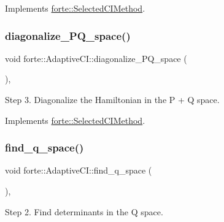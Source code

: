 Implements \mbox{\hyperlink{classforte_1_1_selected_c_i_method_a7b2b41da889659f03361f625c6df44d2}{forte\+::\+Selected\+C\+I\+Method}}.

\mbox{\label{classforte_1_1_adaptive_c_i_a307427ce58102e4a818b2e97583e2ac1}} 
\subsubsection{\texorpdfstring{diagonalize\+\_\+\+P\+Q\+\_\+space()}{diagonalize\_PQ\_space()}}
{\footnotesize\ttfamily void forte\+::\+Adaptive\+C\+I\+::diagonalize\+\_\+\+P\+Q\+\_\+space (\begin{DoxyParamCaption}{ }\end{DoxyParamCaption})\hspace{0.3cm}{\ttfamily [override]}, {\ttfamily [virtual]}}



Step 3. Diagonalize the Hamiltonian in the P + Q space. 



Implements \mbox{\hyperlink{classforte_1_1_selected_c_i_method_a9f01588d22401cd2631a09940ea7db50}{forte\+::\+Selected\+C\+I\+Method}}.

\mbox{\label{classforte_1_1_adaptive_c_i_a84c2bbf2fd0dbcfe3732c0fb6a383bd8}} 
\subsubsection{\texorpdfstring{find\+\_\+q\+\_\+space()}{find\_q\_space()}}
{\footnotesize\ttfamily void forte\+::\+Adaptive\+C\+I\+::find\+\_\+q\+\_\+space (\begin{DoxyParamCaption}{ }\end{DoxyParamCaption})\hspace{0.3cm}{\ttfamily [override]}, {\ttfamily [virtual]}}



Step 2. Find determinants in the Q space. 



